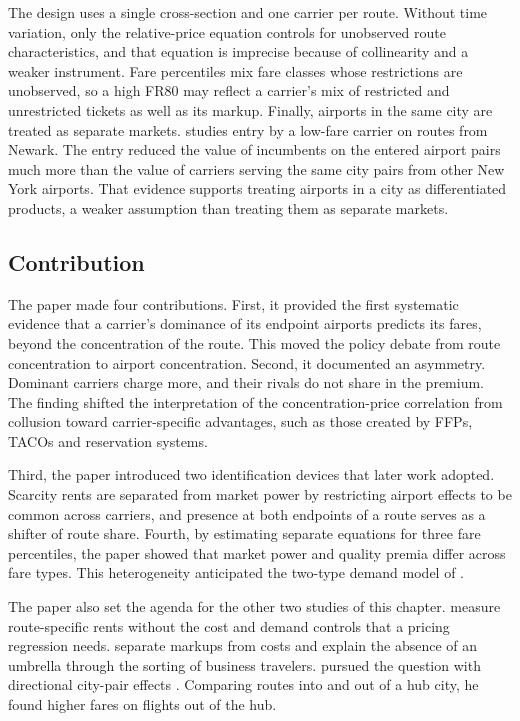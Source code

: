 The design uses a single cross-section and one carrier per route. Without time variation, only the
relative-price equation controls for unobserved route characteristics, and that equation is imprecise because of
collinearity and a weaker instrument. Fare percentiles mix fare classes whose restrictions are unobserved, so a
high FR80 may reflect a carrier's mix of restricted and unrestricted tickets as well as its markup. Finally,
airports in the same city are treated as separate markets.  studies entry by a low-fare carrier
on routes from Newark. The entry reduced the value of incumbents on the entered airport pairs much more than the
value of carriers serving the same city pairs from other New York airports. That evidence supports treating airports in a
city as differentiated products, a weaker assumption than treating them as separate markets.

\subsection{Contribution}\label{sec:09-bor-contribution}

The paper made four contributions. First, it provided the first systematic evidence that a carrier's dominance
of its endpoint airports predicts its fares, beyond the concentration of the route. This moved the policy debate
from route concentration to airport concentration. Second, it documented an asymmetry. Dominant carriers charge
more, and their rivals do not share in the premium. The finding shifted the interpretation of the
concentration-price correlation from collusion toward carrier-specific advantages, such as those created by
FFPs, TACOs and reservation systems.

Third, the paper introduced two identification devices that later work adopted. Scarcity rents are separated
from market power by restricting airport effects to be common across carriers, and presence at both endpoints of
a route serves as a shifter of route share. Fourth, by estimating separate equations for three fare
percentiles, the paper showed that market power and quality premia differ across fare types. This heterogeneity
anticipated the two-type demand model of \citet{BerryCarnallSpiller2006}.

The paper also set the agenda for the other two studies of this chapter. \citet{WhinstonCollins1992} measure
route-specific rents without the cost and demand controls that a pricing regression needs.
\citet{BerryCarnallSpiller2006} separate markups from costs and explain the absence of an umbrella through the
sorting of business travelers. \citet{Borenstein1991} pursued the question with directional city-pair effects
\citep[p.~5]{BerryCarnallSpiller2006}. Comparing routes into and out of a hub city, he found higher fares on
flights out of the hub.

